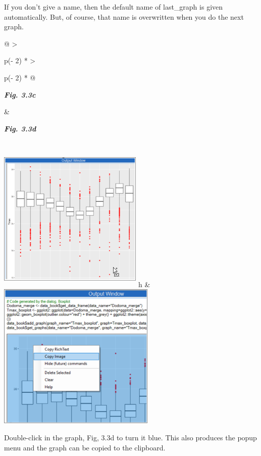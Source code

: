 \documentclass[
  letterpaper,
  DIV=11,
  numbers=noendperiod]{scrreprt}
\begin{document}
If you don't give a name, then the default name of last\_graph is given
automatically. But, of course, that name is overwritten when you do the
next graph.

\begin{longtable}[]{@{}
  >{\raggedright\arraybackslash}p{(\columnwidth - 2\tabcolsep) * }
  >{\raggedright\arraybackslash}p{(\columnwidth - 2\tabcolsep) * }@{}}
\toprule\noalign{}
\begin{minipage}[b]{\linewidth}\raggedright
\textbf{\emph{Fig. 3.3c}}
\end{minipage} & \begin{minipage}[b]{\linewidth}\raggedright
\textbf{\emph{Fig. 3.3d}}
\end{minipage} \\
\midrule\noalign{}
\endhead
\bottomrule\noalign{}
\endlastfoot
\includegraphics[width=2.72331in,height=2.81191in]{figures/Fig3.3c.png}
h &
\includegraphics[width=2.9609in,height=\textheight]{figures/Fig3.3d.png} \\
\end{longtable}

Double-click in the graph, Fig, 3.3d to turn it blue. This also produces
the popup menu and the graph can be copied to the clipboard.
\end{document}
